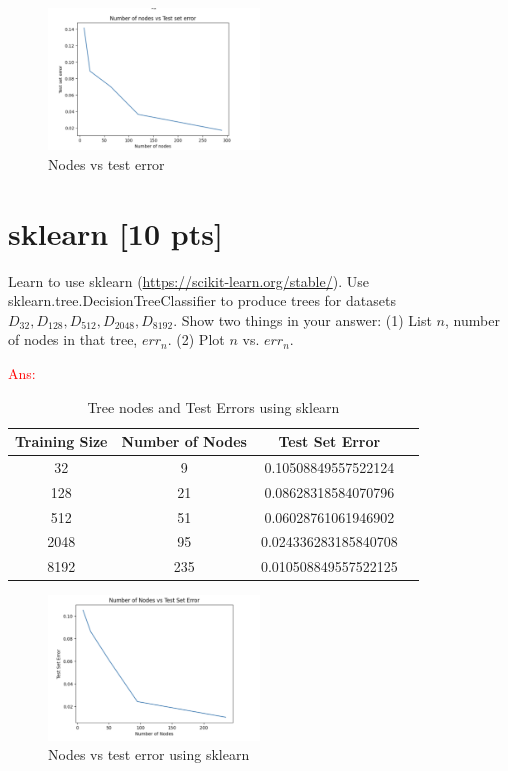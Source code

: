 \documentclass[a4paper]{article}
\theoremstyle{definition}
\newcommand{\red}[1]{\textcolor{red}{#1}}
\begin{document}
\begin{enumerate}
\begin{figure}[htbp]
  \centering
  \includegraphics[width=0.5\textwidth]{nodes_error.png}
  \caption{Nodes vs test error}
  \label{fig:nodes_error}
\end{figure}




  
\end{enumerate}

\section{sklearn [10 pts]}
Learn to use sklearn (\url{https://scikit-learn.org/stable/}).
Use sklearn.tree.DecisionTreeClassifier to produce trees for datasets $D_{32}, D_{128}, D_{512}, D_{2048}, D_{8192}$.  Show two things in your answer: (1) List $n$, number of nodes in that tree, $err_n$. (2) Plot $n$ vs. $err_n$.

\red{Ans:}
\begin{table}[h]
    \centering
    \caption{Tree nodes and Test Errors using sklearn}
    \begin{tabular}{cccc}
        \toprule
        \textbf{Training Size} & \textbf{Number of Nodes} & \textbf{Test Set Error} \\
        \midrule
        32   & 9   & 0.10508849557522124 \\
        128  & 21  & 0.08628318584070796 \\
        512  & 51  & 0.06028761061946902 \\
        2048 & 95  & 0.024336283185840708 \\
        8192 & 235 & 0.010508849557522125 \\
        \bottomrule
    \end{tabular}
\end{table}

\begin{figure}[htbp]
  \centering
  \includegraphics[width=0.5\textwidth]{Nodes_testerror_sklearn.png}
  \caption{Nodes vs test error using sklearn}
  \label{fig:nodes_error_sklearn}
\end{figure}
\end{document}

